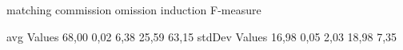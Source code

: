                 matching commission   omission  induction    F-measure   

avg Values      68,00       0,02       6,38      25,59         63,15      
stdDev Values    16,98       0,05       2,03      18,98         7,35

